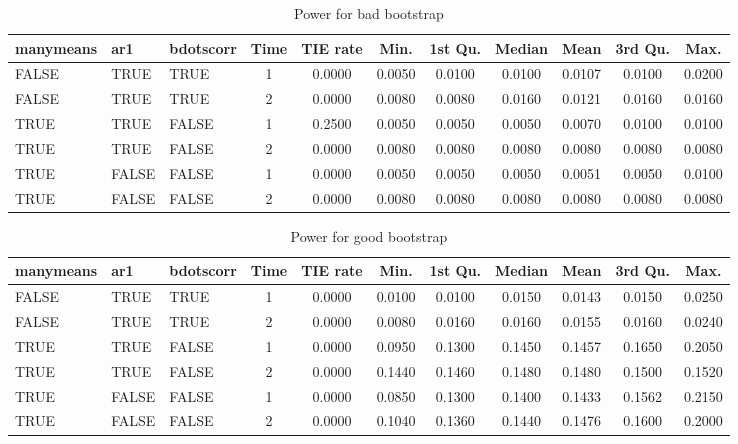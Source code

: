 \documentclass{article}
\begin{document}
\begin{table}[H]
\centering
\begin{tabular}{lllcccccccc}
  \hline
manymeans & ar1 & bdotscorr & Time & TIE rate & Min. & 1st Qu. & Median & Mean & 3rd Qu. & Max. \\ 
  \hline
FALSE & TRUE & TRUE &     1 & 0.0000 & 0.0050 & 0.0100 & 0.0100 & 0.0107 & 0.0100 & 0.0200 \\ 
  FALSE & TRUE & TRUE &     2 & 0.0000 & 0.0080 & 0.0080 & 0.0160 & 0.0121 & 0.0160 & 0.0160 \\ 
  TRUE & TRUE & FALSE &     1 & 0.2500 & 0.0050 & 0.0050 & 0.0050 & 0.0070 & 0.0100 & 0.0100 \\ 
  TRUE & TRUE & FALSE &     2 & 0.0000 & 0.0080 & 0.0080 & 0.0080 & 0.0080 & 0.0080 & 0.0080 \\ 
  TRUE & FALSE & FALSE &     1 & 0.0000 & 0.0050 & 0.0050 & 0.0050 & 0.0051 & 0.0050 & 0.0100 \\ 
  TRUE & FALSE & FALSE &     2 & 0.0000 & 0.0080 & 0.0080 & 0.0080 & 0.0080 & 0.0080 & 0.0080 \\ 
   \hline
\end{tabular}
\caption{Power for bad bootstrap} 
\label{tab:bad_boot_pwr}
\end{table}

\begin{table}[H]
\centering
\begin{tabular}{lllcccccccc}
  \hline
manymeans & ar1 & bdotscorr & Time & TIE rate & Min. & 1st Qu. & Median & Mean & 3rd Qu. & Max. \\ 
  \hline
FALSE & TRUE & TRUE &     1 & 0.0000 & 0.0100 & 0.0100 & 0.0150 & 0.0143 & 0.0150 & 0.0250 \\ 
  FALSE & TRUE & TRUE &     2 & 0.0000 & 0.0080 & 0.0160 & 0.0160 & 0.0155 & 0.0160 & 0.0240 \\ 
  TRUE & TRUE & FALSE &     1 & 0.0000 & 0.0950 & 0.1300 & 0.1450 & 0.1457 & 0.1650 & 0.2050 \\ 
  TRUE & TRUE & FALSE &     2 & 0.0000 & 0.1440 & 0.1460 & 0.1480 & 0.1480 & 0.1500 & 0.1520 \\ 
  TRUE & FALSE & FALSE &     1 & 0.0000 & 0.0850 & 0.1300 & 0.1400 & 0.1433 & 0.1562 & 0.2150 \\ 
  TRUE & FALSE & FALSE &     2 & 0.0000 & 0.1040 & 0.1360 & 0.1440 & 0.1476 & 0.1600 & 0.2000 \\ 
   \hline
\end{tabular}
\caption{Power for good bootstrap} 
\label{tab:good_boot_pwr}
\end{table}
\end{document}
